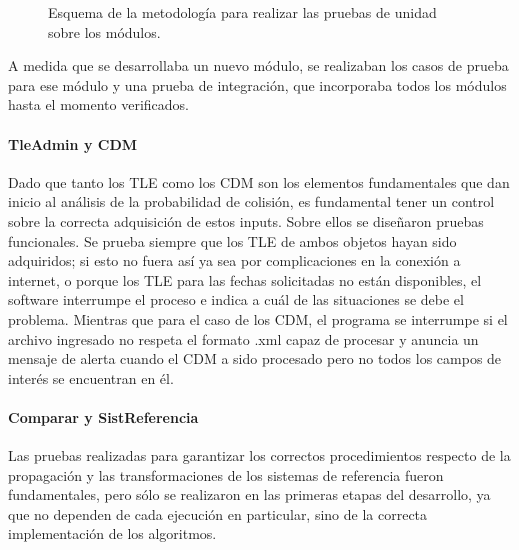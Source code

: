 \begin{figure}[h!]
  \centering
  \caption{Esquema de la metodología para realizar las pruebas de unidad sobre los módulos.}
  \label{fig:metodoprueba}
\end{figure}

A medida que se desarrollaba un nuevo m\'odulo, se realizaban los casos de prueba para ese m\'odulo y una prueba de integraci\'on, que incorporaba todos los m\'odulos hasta el momento verificados.

\paragraph*{TleAdmin y CDM}
Dado que tanto los TLE como los CDM son los elementos fundamentales que dan inicio al an\'alisis de la probabilidad de colisi\'on, es fundamental tener un control sobre la correcta adquisici\'on de estos inputs. Sobre ellos se diseñaron pruebas funcionales. Se prueba siempre que los TLE de ambos objetos hayan sido adquiridos; si esto no fuera as\'i ya sea por complicaciones en la conexi\'on a internet, o porque los TLE para las fechas solicitadas no est\'an disponibles, el software interrumpe el proceso e indica a cu\'al de las situaciones se debe el problema. Mientras que para el caso de los CDM, el programa se interrumpe si el archivo ingresado no respeta el formato .xml capaz de procesar y anuncia un mensaje de alerta cuando el CDM a sido procesado pero no todos los campos de inter\'es se encuentran en \'el. 

\paragraph*{Comparar y SistReferencia}
Las pruebas realizadas para garantizar los correctos procedimientos respecto de la propagaci\'on y las transformaciones de los sistemas de referencia fueron fundamentales, pero s\'olo se realizaron en las primeras etapas del desarrollo, ya que no dependen de cada ejecuci\'on en particular, sino de la correcta implementaci\'on de los algoritmos.  

